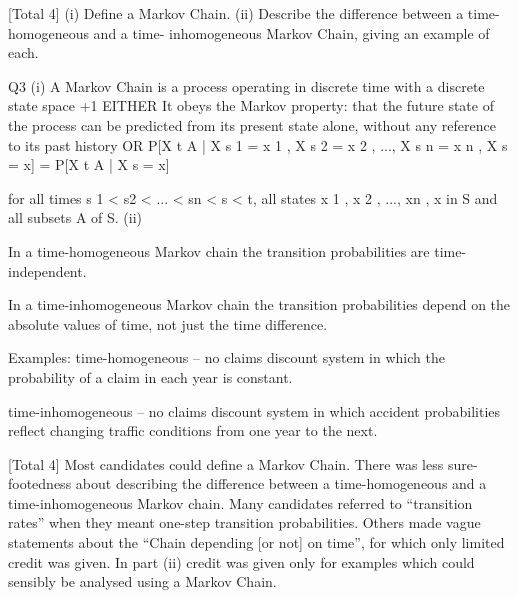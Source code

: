 \documentclass[a4paper,12pt]{article}
\begin{document}
[Total 4]
(i) Define a Markov Chain.
(ii) Describe the difference between a time-homogeneous and a time-
inhomogeneous Markov Chain, giving an example of each.

\newpage

Q3
(i)
A Markov Chain is a process operating in discrete time with a discrete state
space
+1
EITHER
It obeys the Markov property: 
that the future state of the process can be predicted from its present
state alone, without any reference to its past history 
OR
P[X t \in A | X s 1 = x 1 , X s 2 = x 2 , ..., X s n = x n , X s = x] = P[X t \in A | X s = x]

for all times s 1 < s2 < ... < sn < s < t, all states x 1 , x 2 , ..., xn , x in S and
all subsets A of S.
(ii)


In a time-homogeneous Markov chain the transition probabilities are time-
independent.

In a time-inhomogeneous Markov chain the transition probabilities depend on
the absolute values of time, not just the time difference.

Examples: time-homogeneous – no claims discount system in which the
probability of a claim in each year is constant.

time-inhomogeneous – no claims discount system in which accident
probabilities reflect changing traffic conditions from one year to the next. 

[Total 4]
Most candidates could define a Markov Chain. There was less sure-
footedness about describing the difference between a time-homogeneous and
a time-inhomogeneous Markov chain. Many candidates referred to “transition
rates” when they meant one-step transition probabilities. Others made vague
statements about the “Chain depending [or not] on time”, for which only
limited credit was given. In part (ii) credit was given only for examples which
could sensibly be analysed using a Markov Chain.
\end{document}
